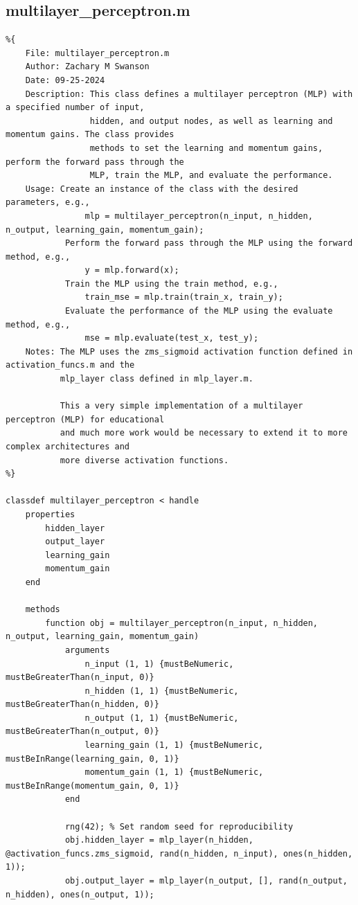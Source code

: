 \documentclass[11pt,pdftex,portrait,letterpaper]{article}
\begin{document}
\subsection{multilayer\_perceptron.m} \label{sec:appMLP}
\begin{lstlisting}
%{
    File: multilayer_perceptron.m
    Author: Zachary M Swanson
    Date: 09-25-2024
    Description: This class defines a multilayer perceptron (MLP) with a specified number of input,
                 hidden, and output nodes, as well as learning and momentum gains. The class provides
                 methods to set the learning and momentum gains, perform the forward pass through the
                 MLP, train the MLP, and evaluate the performance.
    Usage: Create an instance of the class with the desired parameters, e.g.,
                mlp = multilayer_perceptron(n_input, n_hidden, n_output, learning_gain, momentum_gain);
            Perform the forward pass through the MLP using the forward method, e.g.,
                y = mlp.forward(x);
            Train the MLP using the train method, e.g.,
                train_mse = mlp.train(train_x, train_y);
            Evaluate the performance of the MLP using the evaluate method, e.g.,
                mse = mlp.evaluate(test_x, test_y);
    Notes: The MLP uses the zms_sigmoid activation function defined in activation_funcs.m and the
           mlp_layer class defined in mlp_layer.m.

           This a very simple implementation of a multilayer perceptron (MLP) for educational
           and much more work would be necessary to extend it to more complex architectures and
           more diverse activation functions.
%}

classdef multilayer_perceptron < handle
    properties
        hidden_layer
        output_layer
        learning_gain
        momentum_gain
    end

    methods
        function obj = multilayer_perceptron(n_input, n_hidden, n_output, learning_gain, momentum_gain)
            arguments
                n_input (1, 1) {mustBeNumeric, mustBeGreaterThan(n_input, 0)}
                n_hidden (1, 1) {mustBeNumeric, mustBeGreaterThan(n_hidden, 0)}
                n_output (1, 1) {mustBeNumeric, mustBeGreaterThan(n_output, 0)}
                learning_gain (1, 1) {mustBeNumeric, mustBeInRange(learning_gain, 0, 1)}
                momentum_gain (1, 1) {mustBeNumeric, mustBeInRange(momentum_gain, 0, 1)}
            end

            rng(42); % Set random seed for reproducibility
            obj.hidden_layer = mlp_layer(n_hidden, @activation_funcs.zms_sigmoid, rand(n_hidden, n_input), ones(n_hidden, 1));
            obj.output_layer = mlp_layer(n_output, [], rand(n_output, n_hidden), ones(n_output, 1));


\end{lstlisting}
\end{document}
